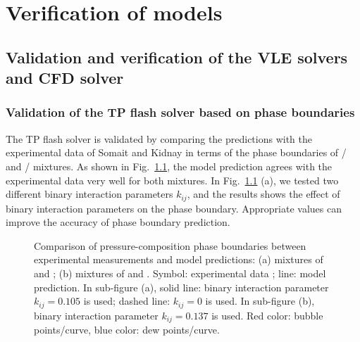 \chapter{Verification of models}
\label{verifi_chapter}

\section{Validation and verification of the VLE solvers and CFD solver} \label{App:vali}


    \subsection{Validation of the TP flash solver based on phase boundaries}
    The TP flash solver is validated by comparing the predictions with the experimental data of Somait and Kidnay \cite{somait1978liquid} in terms of the phase boundaries of / and / mixtures. As shown in Fig.~\ref{v1}, the model prediction agrees with the experimental data very well for both mixtures. In Fig.~\ref{v1} (a), we tested two different binary interaction parameters $k_{ij}$, and the results shows the effect of binary interaction parameters on the phase boundary. Appropriate values can improve the accuracy of phase boundary prediction.

    
    \begin{figure}[htbp]
        \centering
        \caption{Comparison of pressure-composition phase boundaries between experimental measurements and model predictions: (a) mixtures of  and ; (b) mixtures of  and . Symbol: experimental data \cite{somait1978liquid}; line: model prediction. In sub-figure (a), solid line: binary interaction parameter $k_{ij}=0.105$ is used; dashed line: $k_{ij}=0$ is used. In sub-figure (b), binary interaction parameter $k_{ij}=0.137$ is used. Red color: bubble points/curve, blue color: dew points/curve.}
        \label{v1}
    \end{figure}

